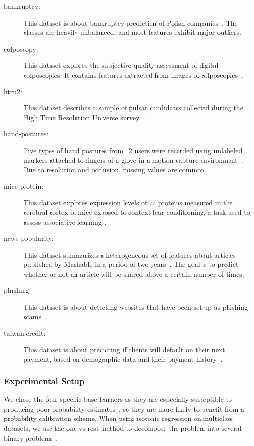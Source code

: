 \documentclass[wcp]{jmlr}
\begin{document}
\begin{description}
  \item[bankruptcy:] This dataset is about bankruptcy prediction of Polish companies~\citep{zikeba2016ensemble}. The classes are heavily unbalanced, and most features exhibit major outliers. 
  
  \item[colposcopy:] This dataset explores the subjective quality assessment of digital colposcopies. It contains features extracted from images of colposcopies~\citep{fernandes2017transfer}.
  
  \item[htru2:] This dataset describes a sample of pulsar candidates collected during the High Time Resolution Universe survey~\citep{lyon2016fifty}.
  
  \item[hand-postures:] Five types of hand postures from 12 users were recorded using unlabeled markers attached to fingers of a glove in a motion capture environment~\citep{gardner20143d}. Due to resolution and occlusion, missing values are common. 
  
  \item[mice-protein:] This dataset explores expression levels of 77 proteins measured in the cerebral cortex of mice exposed to context fear conditioning, a task used to assess associative learning~\citep{higuera2015self}.
  
  \item[news-popularity:] This dataset summarizes a heterogeneous set of features about articles published by Mashable in a period of two years~\citep{fernandes2015proactive}. The goal is to predict whether or not an article will be shared above a certain number of times.

  \item[phishing:] This dataset is about detecting websites that have been set up as phishing scams~\citep{abdelhamid2014phishing}.
  
  \item[taiwan-credit:] This dataset is about predicting if clients will default on their next payment, based on demographic data and their payment history~\citep{yeh2009comparisons}. 
\end{description}


\subsubsection{Experimental Setup}
We chose the four specific base learners as they are especially susceptible to producing poor probability estimates~\citep{niculescu2005predicting}, so they are more likely to benefit from a probability calibration scheme. When using isotonic regression on multiclass datasets, we use the one-vs-rest method to decompose the problem into several binary problems~\citep{zadrozny2002transforming, frank1998using}.
\end{document}
